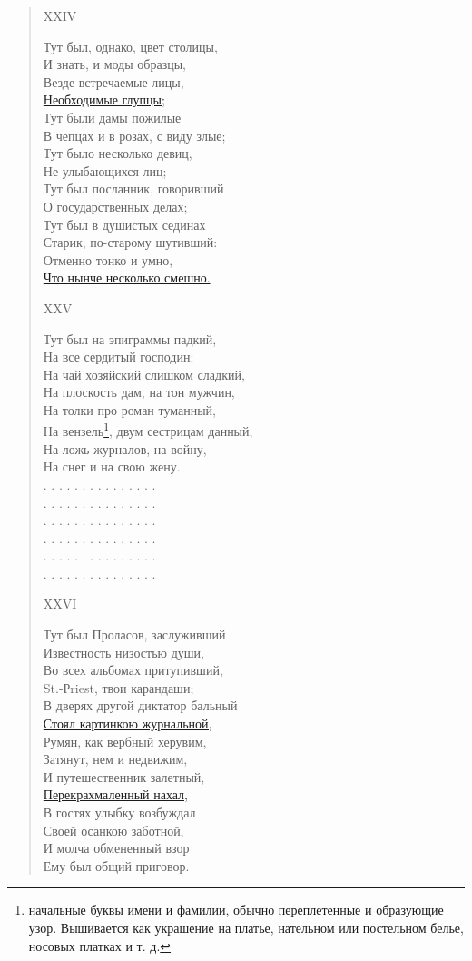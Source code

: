 \begin{verse}
XXIV

Тут был, однако, цвет столицы,\\
И знать, и моды образцы,\\
Везде встречаемые лицы,\\
\hyperref[stupido]{Необходимые глупцы;}\\
Тут были дамы пожилые\\
В чепцах и в розах, с виду злые;\\
Тут было несколько девиц,\\
Не улыбающихся лиц;\\
Тут был посланник, говоривший\\
О государственных делах;\\
Тут был в душистых сединах\\
Старик, по-старому шутивший:\\
Отменно тонко и умно,\\
\hyperref[scherzo]{Что нынче несколько смешно.}

XXV

Тут был на эпиграммы падкий,\\
На все сердитый господин:\\
На чай хозяйский слишком сладкий,\\
На плоскость дам, на тон мужчин,\\
На толки про роман туманный,\\
На вензель\footnote{начальные буквы имени и фамилии, обычно переплетенные и образующие узор. Вышивается как украшение на платье, нательном или постельном белье, носовых платках и т. д.}, двум сестрицам данный,\\
На ложь журналов, на войну,\\
На снег и на свою жену.\\
. . . . . . . . . . . . . . .\\
. . . . . . . . . . . . . . .\\
. . . . . . . . . . . . . . .\\
. . . . . . . . . . . . . . .\\
. . . . . . . . . . . . . . .\\
. . . . . . . . . . . . . . .

XXVI

Тут был Проласов, заслуживший\\
Известность низостью души,\\
Во всех альбомах притупивший,\\
St.-Рriest, твои карандаши;\\
В дверях другой диктатор бальный\\
\hyperref[giornale]{Стоял картинкою журнальной,}\\
Румян, как вербный херувим,\\
Затянут, нем и недвижим,\\
И путешественник залетный,\\
\hyperref[cravatta]{Перекрахмаленный нахал,}\\
В гостях улыбку возбуждал\\
Своей осанкою заботной,\\
И молча обмененный взор\\
Ему был общий приговор.


\end{verse}
